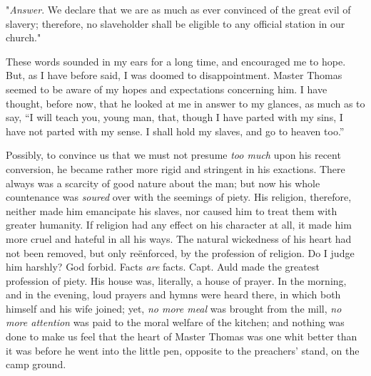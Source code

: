 "\emph{Answer}. We declare that we are as much as ever convinced of the
great evil of slavery; therefore, no slaveholder shall be eligible to
any official station in our church."

These words sounded in my ears for a long time, and encouraged me to
hope. But, as I have before said, I was doomed to disappointment. Master
Thomas seemed to be aware of my hopes and expectations concerning him. I
have thought, before now, that he looked at me in answer to my glances,
as much as to say, ``I will teach you, young man, that, though I have
parted with my sins, I have not parted with my sense. I shall hold my
slaves, and go to heaven too.''

Possibly, to convince us that we must not presume \emph{too much} upon
his recent conversion, he became rather more rigid and stringent in his
exactions. There always was a scarcity of good nature about the man; but
now his whole countenance was \emph{soured} over with the seemings of
piety. His {}religion, therefore, neither made him emancipate his
slaves, nor caused him to treat them with greater humanity. If religion
had any effect on his character at all, it made him more cruel and
hateful in all his ways. The natural wickedness of his heart had not
been removed, but only reënforced, by the profession of religion. Do I
judge him harshly? God forbid. Facts \emph{are} facts. Capt. Auld made
the greatest profession of piety. His house was, literally, a house of
prayer. In the morning, and in the evening, loud prayers and hymns were
heard there, in which both himself and his wife joined; yet, \emph{no
more meal} was brought from the mill, \emph{no more attention} was paid
to the moral welfare of the kitchen; and nothing was done to make us
feel that the heart of Master Thomas was one whit better than it was
before he went into the little pen, opposite to the preachers' stand, on
the camp ground.

